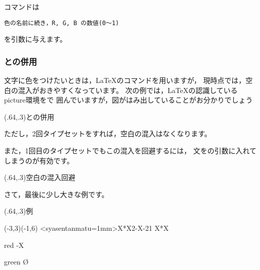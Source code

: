 \documentclass[a4j]{jarticle}
\begin{document}
コマンドは
\begin{jquote}
\begin{verbatim}
色の名前に続き，R, G, B の数値(0〜1)
\end{verbatim}
\end{jquote}
を引数に与えます。

\subsubsection{\texorpdfstring{}{color}との併用}
文字に色をつけたいときは，\LaTeX のコマンドを用いますが，
現時点では，空白の混入がおきやすくなっています。
次の例では，\LaTeX の認識している\textsf{picture}環境をで
囲んでいますが，図がはみ出していることがお分かりでしょう

\begin{showEx}(.64,.3){との併用}
  \fboxsep=0pt\relax{}%
\end{showEx}

ただし，2回タイプセットをすれば，空白の混入はなくなります。

また，1回目のタイプセットでもこの混入を回避するには，
文をの引数に入れてしまうのが有効です。

\begin{showEx}(.64,.3){空白の混入回避}
  \fboxsep=0pt\relax{}%
\end{showEx}

さて，最後に少し大きな例です。

\begin{showEx}(.64,.3){例}
\begin{pszahyou*}[ul=5mm](-3,3)(-1,6)%
  \def\Fx{X*X}%
  \def\Gx{2-X}%
  \gsave
  \YNurii*<syasentanmatu=1mm>\Fx\Gx{-2}{1}%
  \grestore
  \YGurafu*\Fx%
  \begin{EMpscolor}{red}
    \YGurafu*\Gx%
  \end{EMpscolor}
  \begin{EMpscolor}{green}
    \Put\O{\color{blue}\drawXYaxis}%
  \end{EMpscolor}%
\end{pszahyou*}%
\end{showEx}
\end{document}
